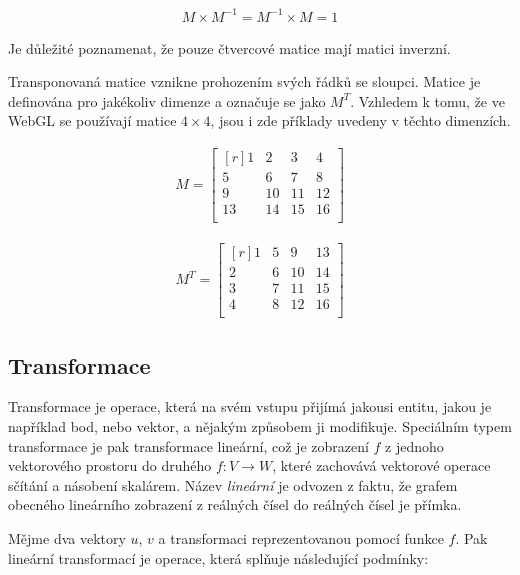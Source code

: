 \begin{align}
M \times M^{-1} = M^{-1} \times M = 1
\end{align}

Je důležité poznamenat, že pouze čtvercové matice mají matici inverzní.

Transponovaná matice vznikne prohozením svých řádků se sloupci. Matice je definována pro jakékoliv dimenze a označuje se jako $M^{T}$. Vzhledem k tomu, že ve WebGL se používají matice $4\times4$, jsou i zde příklady uvedeny v těchto dimenzích.

\begin{align}
 M = 
\begin{bmatrix*}[r]
  1 & 2 & 3 & 4 \\
  5 & 6 & 7 & 8 \\
  9 & 10 & 11 & 12 \\
  13 & 14 & 15 & 16 \\
\end{bmatrix*}
\end{align}

\begin{align} 
M^T = 
\begin{bmatrix*}[r]
  1 & 5 & 9 & 13 \\
  2 & 6 & 10 & 14 \\
  3 & 7 & 11 & 15 \\
  4 & 8 & 12 & 16 \\
\end{bmatrix*}
\end{align}

\subsection*{Transformace}
\label{subsection:transformace}
Transformace je operace, která na svém vstupu přijímá jakousi entitu, jakou je například bod, nebo vektor, a nějakým způsobem ji modifikuje. Speciálním typem transformace je pak transformace lineární, což je zobrazení $f$ z jednoho vektorového prostoru do druhého $f: V \rightarrow W$, které zachovává vektorové operace sčítání a násobení skalárem. Název \textit{lineární} je odvozen z faktu, že grafem obecného lineárního zobrazení z reálných čísel do reálných čísel je přímka.

Mějme dva vektory $u$, $v$ a transformaci reprezentovanou pomocí funkce $f$. Pak lineární transformací je operace, která splňuje následující podmínky:


